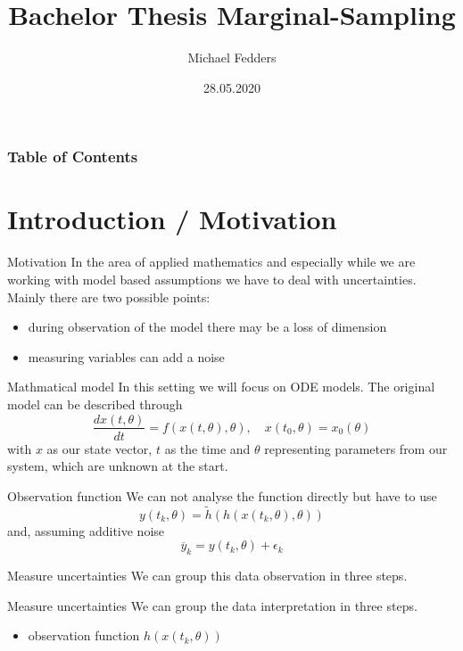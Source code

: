 \documentclass{beamer}
\title{Bachelor Thesis Marginal-Sampling}
\date{28.05.2020}
\author{Michael Fedders}
\begin{document}
	\maketitle
  	\begin{frame}[plain]
		\frametitle{Table of Contents}
		\tableofcontents
	\end{frame}
	
\section{Introduction / Motivation}

  	\begin{frame}{Motivation}
	  	In the area of applied mathematics and especially while we are working
	  	with model based assumptions we have to deal with uncertainties. Mainly
	  	there are two possible points:
	  	\begin{itemize}
	  		\item during observation of the model there may be a \alert{loss} of 
	  		dimension
	  		\item measuring variables can add a \alert{noise}
	  	\end{itemize}
	\end{frame}
  
  	\begin{frame}{Mathmatical model}
     	In this setting we will focus on ODE models. The original model can be described
     	through
     	\[
     	\frac{dx(t,\theta)}{dt} = f(x(t,\theta),\theta), \quad x(t_0,\theta) = 
     	x_0(\theta)
     	\]
     	with $x$ as our state vector, $t$ as the time and $\theta$ representing
     	parameters from our system, which are unknown at the start.
	\end{frame}
	
	\begin{frame}{Observation function}
  		We can not analyse the function directly but have to use
		\[
			y(t_k,\theta) = \tilde{h}(h(x(t_k,\theta),\theta))
		\]
		and, assuming additive noise
		\[
			\overline{y}_{k} = y(t_k,\theta) + \epsilon_{k}
		\]
	\end{frame}
	
	
  	\begin{frame}{Measure uncertainties}
    	We can group this data observation in three steps.      	
  	\end{frame}
  	
  	\begin{frame}{Measure uncertainties}
    	We can group the data interpretation in three steps.
  		\begin{itemize}
   			\item observation function $h(x(t_k,\theta))$
    	\end{itemize}
  	\end{frame}
  	
\end{document}
